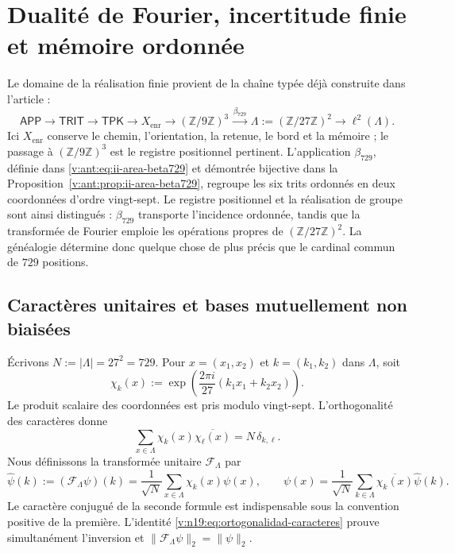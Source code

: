 \section{Dualité de Fourier, incertitude finie et mémoire ordonnée}
\label{v:n19:sec:incertidumbre-fourier}

Le domaine de la réalisation finie provient de la chaîne typée déjà
construite dans l’article :
\begin{equation}
 \mathsf{APP}\longrightarrow\mathsf{TRIT}\longrightarrow\mathsf{TPK}
 \longrightarrow X_{\mathrm{enr}}
 \longrightarrow (\mathbb Z/9\mathbb Z)^3
 \xrightarrow{\,\beta_{729}\,}
 \Lambda:=(\mathbb Z/27\mathbb Z)^2
 \longrightarrow \ell^2(\Lambda).
 \label{v:n19:eq:cadena-tipificada}
\end{equation}
Ici \(X_{\mathrm{enr}}\) conserve le chemin, l’orientation, la retenue, le bord et la
mémoire ; le passage à \((\mathbb Z/9\mathbb Z)^3\) est le registre positionnel
pertinent. L’application \(\beta_{729}\), définie dans
\eqref{v:ant:eq:ii-area-beta729} et démontrée bijective dans la
Proposition~\ref{v:ant:prop:ii-area-beta729}, regroupe les six trits
ordonnés en deux coordonnées d’ordre vingt-sept. Le registre positionnel
et la réalisation de groupe sont ainsi distingués : \(\beta_{729}\)
transporte l’incidence ordonnée, tandis que la transformée de
Fourier emploie les opérations propres de
\((\mathbb Z/27\mathbb Z)^2\). La généalogie détermine donc quelque chose de
plus précis que le cardinal commun de \(729\) positions.

\subsection{Caractères unitaires et bases mutuellement non biaisées}
\label{v:n19:sec:caracteres-mub}

Écrivons \(N:=|\Lambda|=27^2=729\). Pour
\(x=(x_1,x_2)\) et \(k=(k_1,k_2)\) dans \(\Lambda\), soit
\begin{equation}
 \chi_k(x):=
 \exp\!\left(\frac{2\pi i}{27}(k_1x_1+k_2x_2)\right).
 \label{v:n19:eq:caracteres}
\end{equation}
Le produit scalaire des coordonnées est pris modulo vingt-sept.
L’orthogonalité des caractères donne
\begin{equation}
 \sum_{x\in\Lambda}\chi_k(x)\overline{\chi_{\ell}(x)}
 =N\,\delta_{k,\ell}.
 \label{v:n19:eq:ortogonalidad-caracteres}
\end{equation}
Nous définissons la transformée unitaire \(\mathcal F_\Lambda\) par
\begin{equation}
 \widehat\psi(k):=(\mathcal F_\Lambda\psi)(k)
 =\frac1{\sqrt N}\sum_{x\in\Lambda}\chi_k(x)\psi(x),
 \qquad
 \psi(x)=\frac1{\sqrt N}\sum_{k\in\Lambda}
 \overline{\chi_k(x)}\widehat\psi(k).
 \label{v:n19:eq:fourier-inversion}
\end{equation}
Le caractère conjugué de la seconde formule est indispensable sous la
convention positive de la première. L’identité
\eqref{v:n19:eq:ortogonalidad-caracteres} prouve simultanément
l’inversion et \(\|\mathcal F_\Lambda\psi\|_2=\|\psi\|_2\).

